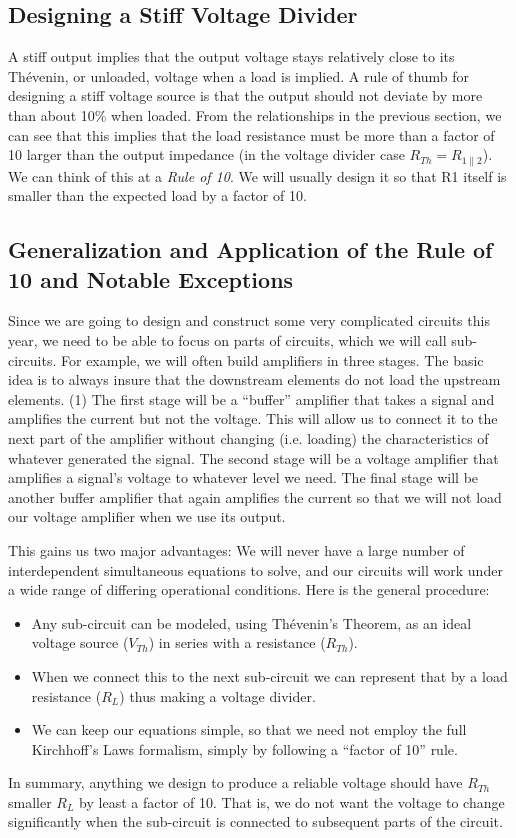 \documentclass{article}
\begin{document}
\subsection{Designing a Stiff Voltage Divider}
A stiff output implies that the output voltage stays relatively close to its Th\'{e}venin, or unloaded, voltage when a load is implied. A rule of thumb for designing a stiff voltage source is that the output should not deviate by more than about 10\% when loaded. From the relationships in the previous section, we can see that this implies that the load resistance must be more than a factor of 10 larger than the output impedance (in the voltage divider case $R_{Th} = R_{1\parallel 2}$). We can think of this at a \emph{Rule of 10}. We will usually design it so that R1 itself is smaller than the expected load by a factor of 10. 

\subsection{Generalization and Application of the Rule of 10 and Notable Exceptions}
Since we are going to design and construct some very complicated circuits this year, we need to be able to focus on parts of circuits, which we will call sub-circuits. For example, we will often build amplifiers in three stages. The basic idea is to always insure that the downstream elements do not load the upstream elements. (1) The first stage will be a ``buffer'' amplifier that takes a signal and amplifies the current but not the voltage. This will allow us to connect it to the next part of the amplifier without changing (i.e. loading) the characteristics of whatever generated the signal. The second stage will be a voltage amplifier that amplifies a signal's voltage to whatever level we need. The final stage will be another buffer amplifier that again amplifies the current so that we will not load our voltage amplifier when we use its output. 

This gains us two major advantages: We will never have a large number of interdependent simultaneous equations to solve, and our circuits will work under a wide range of differing operational conditions.
Here is the general procedure: 
\begin{itemize}
\item Any sub-circuit can be modeled, using Th\'{e}venin's Theorem, as an ideal voltage source ($V_{Th}$) in series with a resistance ($R_{Th}$).
\item When we connect this to the next sub-circuit we can represent that by a load resistance ($R_L$) thus making a voltage divider. 
\item We can keep our equations simple, so that we need not employ the full Kirchhoff's Laws formalism, simply by following a ``factor of 10'' rule. 
\end{itemize}
In summary, anything we design to produce a reliable voltage should have $R_{Th}$ smaller $R_L$ by least a factor of 10. That is, we do not want the voltage to change significantly when the sub-circuit is connected to subsequent parts of the circuit.
\end{document}
